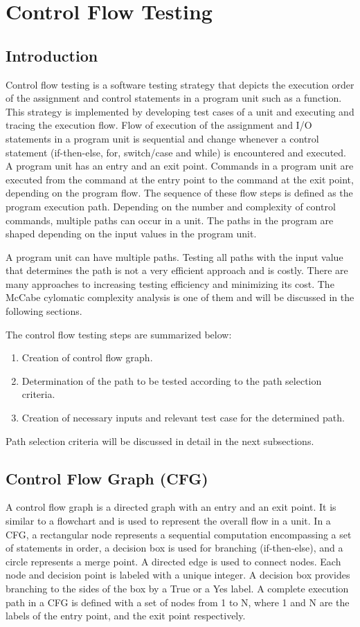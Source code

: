 \chapter{Control Flow Testing}
\section{Introduction}
Control flow testing is a software testing  strategy that depicts the execution order of the assignment and control statements in a program unit such as a function. This strategy is implemented by developing test cases of a unit and executing and tracing the execution flow. Flow of execution of the assignment and I/O statements in a program unit is sequential and change whenever a control statement (if-then-else, for, switch/case and while) is encountered and executed. A program unit has an entry and an exit point. Commands in a program unit are executed from the command at the entry point to the command at the exit point, depending on the program flow. The sequence of these flow steps is defined as the program execution path. Depending on the number and complexity of control commands, multiple paths can occur in a unit. The paths in the program are shaped depending on the input values in the program unit.

A program unit can have multiple paths. Testing all paths with the input value that determines the path is not a very efficient approach and is costly. There are many approaches to increasing testing efficiency and minimizing its cost. The McCabe cylomatic complexity analysis is one of them and will be discussed in the following sections.

The control flow testing steps are summarized below:
\begin{enumerate}
    \item Creation of control flow graph.
    \item Determination of the path to be tested according to the path selection criteria.
    \item Creation of necessary inputs and relevant test case for the determined path.
\end{enumerate}
Path selection criteria will be discussed in detail in the next subsections.

\section{Control Flow Graph (CFG)}
A control flow graph  is a directed graph with an entry and an exit point. It is similar to a flowchart and is used to represent the overall flow in a unit. In a CFG, a rectangular node represents a sequential computation encompassing a set of statements in order, a decision box is used for branching (if-then-else), and a circle represents a merge point. A directed edge is used to connect nodes. Each node and decision point is labeled with a unique integer. A decision box provides branching to the sides of the box by a True or a Yes label. A complete execution path in a CFG is defined with a set of nodes from 1 to N, where 1 and N are the labels of the entry point, and the exit point respectively.


